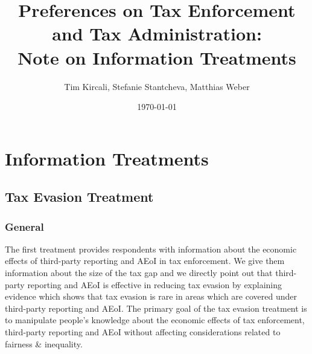 \documentclass[11pt]{article}
\title{Preferences on Tax Enforcement and Tax Administration:\\Note on Information Treatments}
\author{Tim Kircali, Stefanie Stantcheva, Matthias Weber}
\date{\today} %
\begin{document}
\maketitle
\section{Information Treatments}
\subsection{Tax Evasion Treatment}
\subsubsection*{General}
The first treatment provides respondents with information about the economic effects of third-party reporting and AEoI in tax enforcement. We give them information about the size of the tax gap and we directly point out that third-party reporting and AEoI is effective in reducing tax evasion by explaining evidence which shows that tax evasion is rare in areas which are covered under third-party reporting and AEoI. The primary goal of the tax evasion treatment is to manipulate people’s knowledge about the economic effects of tax enforcement, third-party reporting and AEoI without affecting considerations related to fairness \& inequality.   
\end{document}
